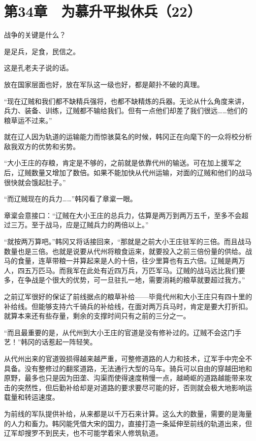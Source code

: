 \section{第34章　为慕升平拟休兵（22）}

战争的关键是什么？

是足兵，足食，民信之。

这是孔老夫子说的话。

放在国家层面也好，放在军队这一级也好，都是颠扑不破的真理。

“现在辽贼和我们都不缺精兵强将，也都不缺精炼的兵器。无论从什么角度来讲，兵力、装备、训练，辽贼都不输给我们。但有一点他们却差了我们很远……他们的粮草运不过来。”

就在辽人因为轨道的运输能力而惊骇莫名的时候，韩冈正在向麾下的一众将校分析敌我双方的优势和劣势。

“大小王庄的存粮，肯定是不够的，之前就是依靠代州的输送。可在加上援军之后，辽贼数量又增加了数倍。如果不能加快从代州运输，对面的辽贼和他们的战马很快就会饿起肚子。”

“而辽贼现在的兵力……”韩冈看了章楶一眼。

章楶会意接口：“辽贼在大小王庄的总兵力，估算是两万到两万五千，至多不会超过三万。至于战马，应是辽贼兵力的两倍以上。”

“就按两万算吧。”韩冈又将话接回来，“那就是之前大小王庄驻军的三倍。而且战马数量也是三倍。也就是说要从代州将粮食运来，就要投入之前三倍份量的供给。战马的食量，连草带粮一并算起来是人的十倍，往少里算也有五六倍。辽贼是两万人，四五万匹马。而我军在此处有近四万兵，万匹军马。辽贼的战马远比我们要多，在争战是个很大的优势，可一旦驻扎一地，需要消耗的粮草就要超过我方。”

之前辽军很好的保证了前线据点的粮草补给——毕竟代州和大小王庄只有四十里的补给线。但能够支持六千骑兵的补给线，在面对两万兵马时，肯定是要大打折扣。就算本来还有些存量，剩余的支撑时间只有之前的三分之一。

“而且最重要的是，从代州到大小王庄的官道是没有修补过的。辽贼不会这门手艺！”韩冈的话惹起一阵轻笑。

从代州出来的官道毁损得越来越严重，可整修道路的人力和技术，辽军手中完全不具备。没有整修过的翻浆道路，无法通行大型的马车。骑兵可以自由的穿越田地和原野，最多也只是因为田垄、沟渠而使得速度稍慢一点，越崎岖的道路越能带来攻击的突然性，但后勤补给却是对道路的要求要尽可能的好，否则就会极大地影响运载量和转运速度。

为前线的军队提供补给，从来都是以千万石来计算。这么大的数量，需要的是海量的人力和畜力。韩冈能凭借大宋的国力，直接打造一条延伸至前线的轨道出来，但辽军却搜罗不到民夫，也不可能学着宋人修筑轨道。


